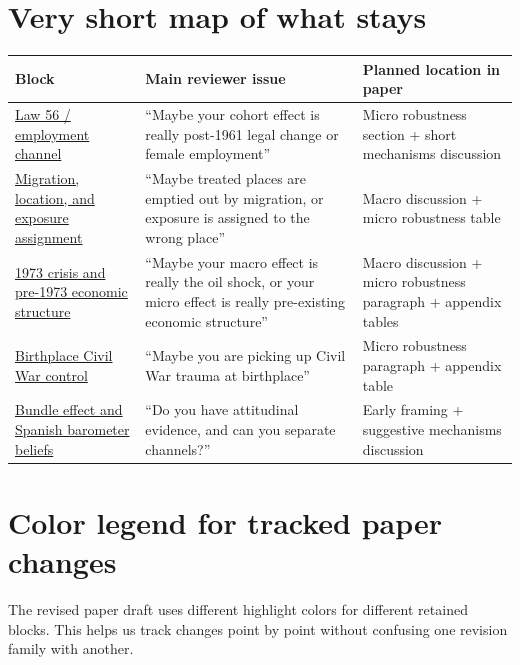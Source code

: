 \documentclass[11pt]{article}
\begin{document}
\section*{Very short map of what stays}

\begin{longtable}{p{} p{} p{}}
\toprule
Block & Main reviewer issue & Planned location in paper \\
\midrule
\hyperref[sec:law56]{Law 56 / employment channel} & ``Maybe your cohort effect is really post-1961 legal change or female employment'' & Micro robustness section + short mechanisms discussion \\
\hyperref[sec:migration]{Migration, location, and exposure assignment} & ``Maybe treated places are emptied out by migration, or exposure is assigned to the wrong place'' & Macro discussion + micro robustness table \\
\hyperref[sec:oilshock]{1973 crisis and pre-1973 economic structure} & ``Maybe your macro effect is really the oil shock, or your micro effect is really pre-existing economic structure'' & Macro discussion + micro robustness paragraph + appendix tables \\
\hyperref[sec:warbirth]{Birthplace Civil War control} & ``Maybe you are picking up Civil War trauma at birthplace'' & Micro robustness paragraph + appendix table \\
\hyperref[sec:beliefs]{Bundle effect and Spanish barometer beliefs} & ``Do you have attitudinal evidence, and can you separate channels?'' & Early framing + suggestive mechanisms discussion \\
\bottomrule
\end{longtable}

\section*{Color legend for tracked paper changes}

The revised paper draft uses different highlight colors for different retained blocks. This helps us track changes point by point without confusing one revision family with another.
\end{document}
